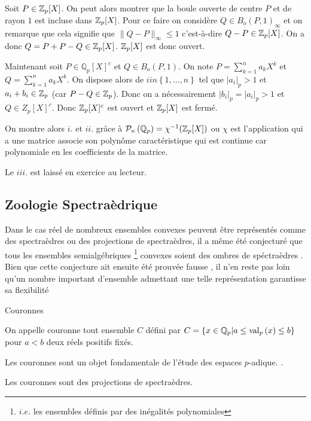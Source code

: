 Soit $P \in  \mathbb {Z}_p [X]$. On peut alors montrer que la boule ouverte de centre $P$ et de rayon $1$ est incluse dans $ \mathbb {Z}_p [X]$. Pour ce faire on considère $Q \in B_{o}\left( P,1 \right)_\infty $ et on remarque que cela signifie que $\|Q-P\|_\infty \le 1$ c'est-à-dire $Q-P \in  \mathbb {Z}_p [X]$. On a donc $Q = P + P-Q \in  \mathbb {Z}_p [X]$. 
$ \mathbb {Z}_p [X]$ est donc ouvert.

Maintenant soit $P \in \mathbb{Q}_{ p } [X]^c$ et $Q \in B_o\left( P, 1 \right) $. On note $P = \sum_{k=1}^{n} a_k X^k$ et $Q = \sum_{k=1}^{n} a_k X^k$. On dispose alors de $i in \left\{  1,\ldots,n \right\} $ tel que $|a_{i}|_p >1$ et $a_i + b_{i} \in  \mathbb {Z}_p $ (car $P-Q \in  \mathbb {Z}_p $). Donc on a nécessairement $|b_i|_p = |a_i|_p > 1$ et $Q \in Z_p[X]^c$.
Donc $ \mathbb {Z}_p [X]^c$ est ouvert et $ \mathbb {Z}_p [X]$ est fermé. 

 
On montre alors $i.$ et $ii.$ grâce à $\mathcal{P}_n \left( \mathbb{Q}_p \right) = \chi^{-1}(  \mathbb {Z}_p [X]) $ ou $\chi$ est l'application qui a une matrice associe son polynôme caractéristique qui est continue car polynomiale en les coefficients de la matrice.



Le $iii$. est laissé en exercice au lecteur. 


\subsection{Zoologie Spectraèdrique}
Dans le cas réel de nombreux ensembles convexes peuvent être représentés comme des spectraèdres ou des projections de spectraèdres, il a même été conjecturé que tous les ensembles semialgébriques \footnote{$i.e.$ les ensembles définis par des inégalités polynomiales} convexes soient des ombres de spéctraèdres . Bien que cette conjecture ait ensuite été prouvée fausse , il n'en reste pas loin qu'un nombre important d'ensemble admettant une telle représentation garantisse sa flexibilité 

\begin{definition}
	Couronnes

	On appelle couronne tout ensemble $C$ défini par $C = \{x \in \mathbb{Q}_{p}  | a\le \text{val}_p\left(x\right) \le b\} $ pour $a < b$ deux réels positifs fixés.
\end{definition}

Les couronnes sont un objet fondamentale de l'étude des espaces $p$-adique. . 
\begin{proposition}
	Les couronnes sont des projections de spectraèdres.
\end{proposition} 

